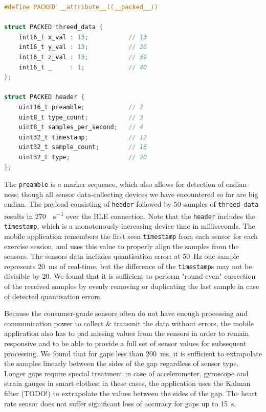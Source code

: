 \documentclass[a4paper, 10 pt, conference]{IEEEtran}
\begin{document}
\begin{lstlisting}[language=C,caption={BLE 3-axis data},label={lst:threed-data}]
#define PACKED __attribute__((__packed__))

struct PACKED threed_data {
    int16_t x_val : 13;           // 13
    int16_t y_val : 13;           // 26
    int16_t z_val : 13;           // 39
    int16_t _     : 1;            // 40
};

struct PACKED header {
    uint16_t preamble;            // 2
    uint8_t type_count;           // 3
    uint8_t samples_per_second;   // 4
    uint32_t timestamp;           // 12
    uint32_t sample_count;        // 16
    uint32_t type;                // 20
};
\end{lstlisting}

The \lstinline{preamble} is a marker sequence, which also allows for detection of endian-ness; though all sensor data-collecting devices we have encountered so far are big endian. The payload consisting of \lstinline{header} followed by 50 samples of \lstinline{threed_data} results in \SI{270}{\byte\per\second} over the BLE connection. Note that the \lstinline{header} includes the \lstinline{timestamp}, which is a monotonously-increasing device time in milliseconds. The mobile application remembers the first seen \lstinline{timestamp} from each sensor for each exercise session, and uses this value to properly align the samples from the sensors. The sensors data includes quantisation error: at \SI{50}{\hertz} one sample represents \SI{20}{\milli\second} of real-time, but the difference of the \lstinline{timestamp}s may not be divisible by $20$. We found that it is sufficient to perform "round-even" correction of the received samples by evenly removing or duplicating the last sample in case of detected quantisation errors.

Because the consumer-grade sensors often do not have enough processing and communication power to collect \& transmit the data without errors, the mobile application also has to pad missing values from the sensors in order to remain responsive and to be able to provide a full set of sensor values for subsequent processing. We found that for gaps less than \SI{200}{\milli\second}, it is sufficient to extrapolate the samples linearly between the sides of the gap regardless of sensor type. Longer gaps require special treatment in case of accelerometer, gyroscope and strain gauges in smart clothes: in these cases, the application uses the Kalman filter (TODO!) to extrapolate the values between the sides of the gap. The heart rate sensor does not suffer significant loss of accuracy for gaps up to \SI{15}{\second}.
\end{document}
